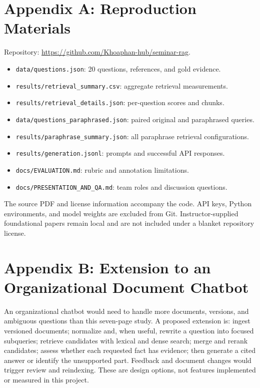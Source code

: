 \documentclass[12pt,a4paper]{article}
\begin{document}
\section*{Appendix A: Reproduction Materials}
\begingroup\small
Repository: \url{https://github.com/Khoaphan-hub/seminar-rag}.
\begin{itemize}\setlength{\itemsep}{0pt}\setlength{\parskip}{0pt}
\item \texttt{data/questions.json}: 20 questions, references, and gold evidence.
\item \texttt{results/retrieval\_summary.csv}: aggregate retrieval measurements.
\item \texttt{results/retrieval\_details.json}: per-question scores and chunks.
\item \texttt{data/questions\_paraphrased.json}: paired original and paraphrased queries.
\item \texttt{results/paraphrase\_summary.json}: all paraphrase retrieval configurations.
\item \texttt{results/generation.jsonl}: prompts and successful API responses.
\item \texttt{docs/EVALUATION.md}: rubric and annotation limitations.
\item \texttt{docs/PRESENTATION\_AND\_QA.md}: team roles and discussion questions.
\end{itemize}
The source PDF and license information accompany the code. API keys, Python environments, and model weights are excluded from Git. Instructor-supplied foundational papers remain local and are not included under a blanket repository license.
\endgroup
\clearpage
\section*{Appendix B: Extension to an Organizational Document Chatbot}
An organizational chatbot would need to handle more documents, versions, and ambiguous questions than this seven-page study. A proposed extension is: ingest versioned documents; normalize and, when useful, rewrite a question into focused subqueries; retrieve candidates with lexical and dense search; merge and rerank candidates; assess whether each requested fact has evidence; then generate a cited answer or identify the unsupported part. Feedback and document changes would trigger review and reindexing. These are design options, not features implemented or measured in this project.
\end{document}
